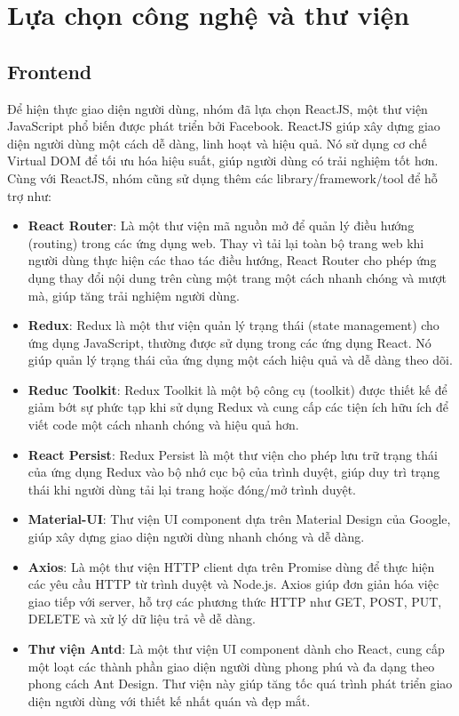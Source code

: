 \section{Lựa chọn công nghệ và thư viện}
\subsection{Frontend}
\noindent Để hiện thực giao diện người dùng, nhóm đã lựa chọn ReactJS, một thư viện JavaScript phổ biến được phát triển bởi Facebook. ReactJS giúp xây dựng giao diện người dùng một cách dễ dàng, linh hoạt và hiệu quả. Nó sử dụng cơ chế Virtual DOM để tối ưu hóa hiệu suất, giúp người dùng có trải nghiệm tốt hơn.\\[0.5cm]
Cùng với ReactJS, nhóm cũng sử dụng thêm các library/framework/tool để hỗ trợ như:
\begin{itemize}
    \item \textbf{React Router}: Là một thư viện mã nguồn mở để quản lý điều hướng (routing) trong các ứng dụng
    web. Thay vì tải lại toàn bộ trang web khi người dùng thực hiện các thao tác điều hướng, React
    Router cho phép ứng dụng thay đổi nội dung trên cùng một trang một cách nhanh chóng và mượt
    mà, giúp tăng trải nghiệm người dùng.
    \item \textbf{Redux}: Redux là một thư viện quản lý trạng thái (state management) cho ứng dụng JavaScript, thường được sử dụng trong các ứng dụng React. Nó giúp quản lý trạng thái của ứng dụng một cách hiệu quả và dễ dàng theo dõi.
    \item \textbf{Reduc Toolkit}: Redux Toolkit là một bộ công cụ (toolkit) được thiết kế để giảm bớt sự phức tạp khi sử dụng Redux và cung cấp các tiện ích hữu ích để viết code một cách nhanh chóng và hiệu quả hơn. 
    \item \textbf{React Persist}: Redux Persist là một thư viện cho phép lưu trữ trạng thái của ứng dụng Redux vào bộ nhớ cục bộ của trình duyệt, giúp duy trì trạng thái khi người dùng tải lại trang hoặc đóng/mở trình duyệt.
    \item \textbf{Material-UI}: Thư viện UI component dựa trên Material Design của Google, giúp xây dựng giao diện người dùng nhanh chóng và dễ dàng.
    \item \textbf{Axios}: Là một thư viện HTTP client dựa trên Promise dùng để thực hiện các yêu cầu HTTP từ trình duyệt và Node.js. Axios giúp đơn giản hóa việc giao tiếp với server, hỗ trợ các phương thức HTTP như GET, POST, PUT, DELETE và xử lý dữ liệu trả về dễ dàng.
    \item \textbf{Thư viện Antd}: Là một thư viện UI component dành cho React, cung cấp một loạt các thành phần giao diện người dùng phong phú và đa dạng theo phong cách Ant Design. Thư viện này giúp tăng tốc quá trình phát triển giao diện người dùng với thiết kế nhất quán và đẹp mắt.

\end{itemize}
